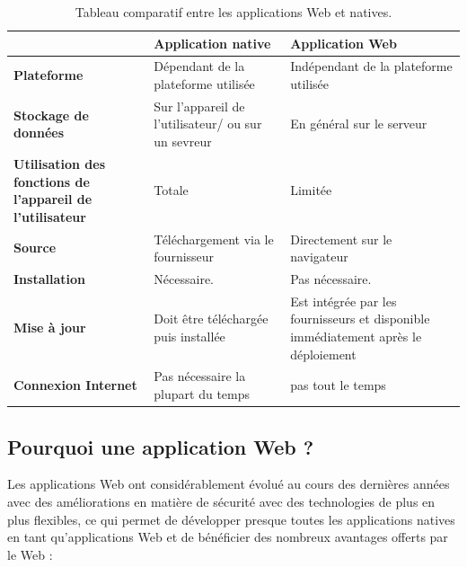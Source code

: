 \begin{table}[!h]
  \small
  \centering
  \footnotesize{
   \begin{tabular}{|p{4cm}|p{4cm}|p{4cm}|} %
    \hline
      & \textbf{Application native} & \textbf{Application Web} \\
    \hline
   \textbf{Plateforme} & Dépendant de la plateforme utilisée & Indépendant de la plateforme utilisée \\
    \hline
    \textbf{Stockage de données} & Sur l’appareil de l’utilisateur/ ou sur un sevreur & En général sur le serveur \\
    \hline
    \textbf{Utilisation des fonctions de l’appareil de l’utilisateur} & Totale & Limitée \\
    \hline
    \textbf{Source} & Téléchargement via le fournisseur & Directement sur le navigateur \\
    \hline
    \textbf{Installation} & Nécessaire. & Pas nécessaire. \\
    \hline
    \textbf{Mise à jour} & Doit être téléchargée puis installée & Est intégrée par les fournisseurs et disponible immédiatement après le déploiement \\
    \hline
    \textbf{Connexion Internet} & Pas nécessaire la plupart du temps & pas tout le temps \\
    \hline
    \end{tabular}}
    \caption{Tableau comparatif entre les applications Web et natives.} 
    \label{tab1}
\end{table}
    
\subsection{Pourquoi une application Web ?}
Les applications Web ont considérablement évolué au cours des dernières années
avec des améliorations en matière de sécurité avec des technologies de plus en
plus flexibles, ce qui permet de développer presque toutes les applications
natives en tant qu’applications Web et de bénéficier des nombreux avantages
offerts par le Web :
        
